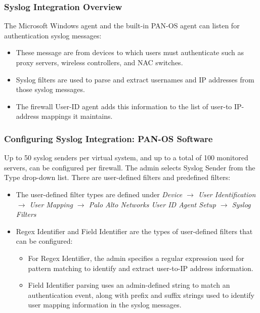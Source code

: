 \subsubsection{Syslog Integration Overview}
The Microsoft Windows agent and the built-in PAN-OS agent can listen for authentication syslog messages:
\begin{itemize}
    \item These message are from devices to which users must authenticate such as proxy servers, wireless controllers, and NAC switches.
    \item Syslog filters are used to parse and extract usernames and IP addresses from those syslog messages.
    \item The firewall User-ID agent adds this information to the list of user-to IP-address mappings it maintains.
\end{itemize}
\subsubsection{Configuring Syslog Integration: PAN-OS Software}
Up to 50 syslog senders per virtual system, and up to a total of 100 monitored servers, can be configured per firewall.
The admin selects Syslog Sender from the Type drop-down list.
There are user-defined filters and predefined filters:
\begin{itemize}
    \item The user-defined filter types are defined under \textit{Device $\rightarrow$ User Identification $\rightarrow$ User Mapping $\rightarrow$ Palo Alto Networks User ID Agent Setup $\rightarrow$ Syslog Filters}
    \item Regex Identifier and Field Identifier are the types of user-defined filters that can be configured:
        \begin{itemize}
            \item For Regex Identifier, the admin specifies a regular expression used for pattern matching to identify and extract user-to-IP address information.
            \item Field Identifier parsing uses an admin-defined string to match an authentication event, along with prefix and suffix strings used to identify user mapping information in the syslog messages.
        \end{itemize}
\end{itemize}

